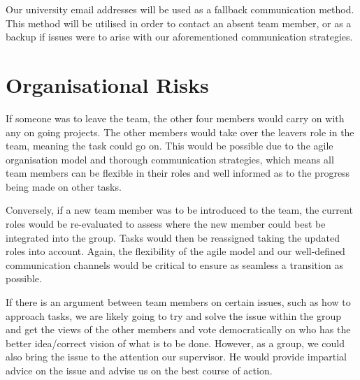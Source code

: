 \documentclass{article}
\begin{document}
Our university email addresses will be used as a fallback communication method. This method will be utilised in order to contact an absent team member, or as a backup if issues were to arise with our aforementioned communication strategies.

\section{Organisational Risks}
If someone was to leave the team, the other four members would carry on with
any on going projects. The other members would take over the leavers role in
the team, meaning the task could go on. This would be possible due to the agile
organisation model and thorough communication strategies, which means all team
members can be flexible in their roles and well informed as to the progress
being made on other tasks.

Conversely, if a new team member was to be introduced to the team, the current roles would be re-evaluated to assess where the new member could best be integrated into the group. Tasks would then be reassigned taking the updated roles into account. Again, the flexibility of the agile model and our well-defined communication channels would be critical to ensure as seamless a transition as possible. 

If there is an argument between team members on certain issues,
such as how to approach tasks, we are likely going to try and solve the issue
within the group and get the views of the other members and vote democratically
on who has the better idea/correct vision of what is to be done. However, as a group, we could also bring the issue to the attention our supervisor. He would provide impartial advice on the issue and advise us on the best course of action.
\end{document}
